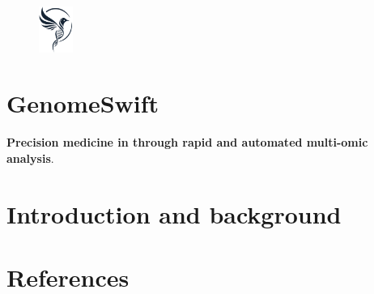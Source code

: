 \documentclass[
]{article}
\author{}
\date{}
\begin{document}
%
%
% 

\tableofcontents  %

\newpage  %

\begin{figure}[H] %
  \begin{flushright} %
    \vspace{-1em} %
    \includegraphics[width=0.1\textwidth]{../../resources/images/genome_swift/genome_swift_logo.png}
    \vspace{-4em} %
  \end{flushright}
\end{figure}

\section*{GenomeSwift}
\textbf{Precision medicine in through rapid and automated multi-omic analysis}.


\section{Introduction and background}












\section{References}
 

\end{document}
